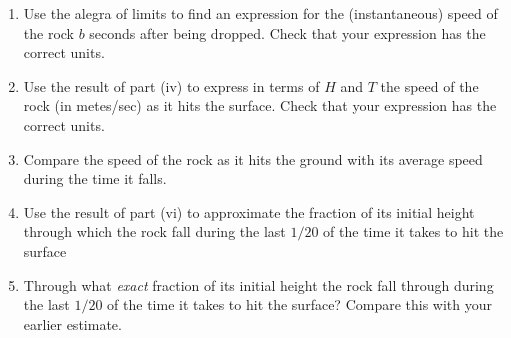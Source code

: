 \documentclass{ximera}
\begin{document}
\begin{question}
\begin{enumerate}
\begin{enumerate}
\item Use the alegra of limits to find an expression for the (instantaneous) speed of the rock $b$ seconds after being dropped. Check that your expression has the correct units.

\item Use the result of part (iv) to express in terms of $H$ and $T$ the speed of the rock (in metes/sec) as it hits the surface. Check that your expression has the correct units.

\item Compare the speed of the rock as it hits the ground with its average speed during the time it falls.

\item Use the result of part (vi) to approximate the fraction of its initial height through which the rock fall during the last $1/20$ of the time it takes to hit the surface

\item Through what \emph{exact} fraction of its initial height the rock fall through during the last $1/20$ of the time it takes to hit the surface? Compare this with your earlier estimate.

\end{enumerate}

\end{enumerate}


\end{question}
\end{document}

